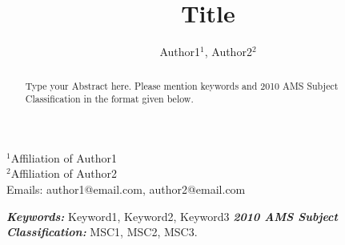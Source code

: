 \documentclass[amstex,12pt,reqno]{article}
\date{}
\title{Title}
\author{Author1${}^{1}$, Author2${}^{2}$}
\providecommand{\keywords}[1]{\textbf{\textit{Keywords:}} #1}
\begin{document}
\maketitle
\begin{center} ${}^{1}$Affiliation of Author1\\ ${}^{2}$Affiliation of Author2\\
Emails: author1@email.com, author2@email.com
\end{center}

\begin{abstract}
Type your Abstract here. Please mention keywords and 2010 AMS Subject Classification  in the format given below.
\end{abstract}
\keywords{Keyword1, Keyword2, Keyword3}\newline
\newline
{\bf \emph{ 2010 AMS Subject Classification:}} MSC1, MSC2, MSC3.
\end{document}
